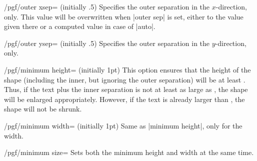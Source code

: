 \begin{key}{/pgf/outer xsep= (initially .5\string\pgflinewidth)}
    Specifies the outer separation in the $x$-direction, only. This value will
    be overwritten when |outer sep| is set, either to the value given there or
    a computed value in case of |auto|.
\end{key}

\begin{key}{/pgf/outer ysep= (initially .5\string\pgflinewidth)}
    Specifies the outer separation in the $y$-direction, only.
\end{key}

\begin{key}{/pgf/minimum height= (initially 1pt)}
    This option ensures that the height of the shape (including the inner, but
    ignoring the outer separation) will be at least . Thus, if
    the text plus the inner separation is not at least as large as
    , the shape will be enlarged appropriately. However, if the
    text is already larger than , the shape will not be shrunk.
\begin{codeexample}[]
\end{codeexample}
\end{key}

\begin{key}{/pgf/minimum width= (initially 1pt)}
    Same as |minimum height|, only for the width.
\begin{codeexample}[]
\end{codeexample}
\end{key}

\begin{key}{/pgf/minimum size=}
    Sets both the minimum height and width at the same time.
\begin{codeexample}[]
\end{codeexample}
\end{key}

